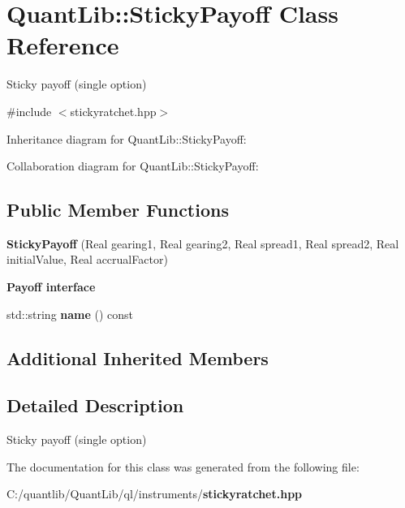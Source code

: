 \section{Quant\+Lib\+:\+:Sticky\+Payoff Class Reference}
\label{class_quant_lib_1_1_sticky_payoff}


Sticky payoff (single option)  




{\ttfamily \#include $<$stickyratchet.\+hpp$>$}



Inheritance diagram for Quant\+Lib\+:\+:Sticky\+Payoff\+:


Collaboration diagram for Quant\+Lib\+:\+:Sticky\+Payoff\+:
\subsection*{Public Member Functions}
\begin{DoxyCompactItemize}
\item 
{\bfseries Sticky\+Payoff} (Real gearing1, Real gearing2, Real spread1, Real spread2, Real initial\+Value, Real accrual\+Factor)\label{class_quant_lib_1_1_sticky_payoff_a17e865c105ad3c81947d9cdbf9833c57}

\end{DoxyCompactItemize}
\begin{Indent}{\bf Payoff interface}\par
\begin{DoxyCompactItemize}
\item 
std\+::string {\bfseries name} () const \label{class_quant_lib_1_1_sticky_payoff_a7b0d6fdc64927b210a3b6b140943f3c5}

\end{DoxyCompactItemize}
\end{Indent}
\subsection*{Additional Inherited Members}


\subsection{Detailed Description}
Sticky payoff (single option) 

The documentation for this class was generated from the following file\+:\begin{DoxyCompactItemize}
\item 
C\+:/quantlib/\+Quant\+Lib/ql/instruments/{\bf stickyratchet.\+hpp}\end{DoxyCompactItemize}
